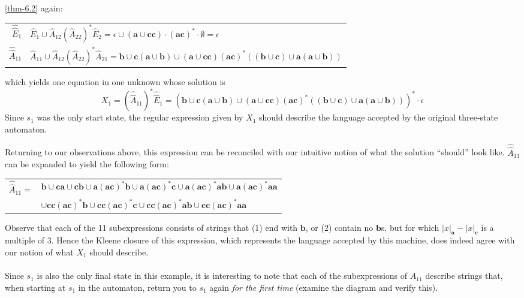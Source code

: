 \ref{thm-6.2} again:
\begin{center}\begin{tabular}{r@{ = }l}
$\hat{\hat{E}}_1$ & $\hat{E}_1 \cup \hat{A}_{12}(\hat{A}_{22})^*\hat{E}_2 = \epsilon
	\cup (\pmb{a}\cup\pmb{cc})\cdot(\pmb{ac})^*\cdot\emptyset = \epsilon$ \\
$\hat{\hat{A}}_{11}$ & $\hat{A}_{11}\cup\hat{A}_{12}(\hat{A}_{22})^*\hat{A}_{21} =
	\pmb{b}\cup\pmb{c}(\pmb{a}\cup\pmb{b})\cup(\pmb{a}\cup\pmb{cc})
	(\pmb{ac})^*((\pmb{b}\cup\pmb{c})\cup\pmb{a}(\pmb{a}\cup\pmb{b}))$
\end{tabular}\end{center}
which yields one equation in one unknown whose solution is
\[ X_1 = (\hat{\hat{A}}_{11})^*\hat{\hat{E}}_1 = (\pmb{b}\cup\pmb{c}(\pmb{a}\cup
	\pmb{b})\cup(\pmb{a}\cup\pmb{cc})(\pmb{ac})^*((\pmb{b}\cup\pmb{c})\cup
	\pmb{a}(\pmb{a}\cup\pmb{b})))^*\cdot\epsilon \]
Since $s_1$ was the only start state, the regular expression given by $X_1$
should describe the language accepted by the original three-state automaton.

Returning to our observations above, this expression can be reconciled with
our intuitive notion of what the solution ``should'' look like.
$\hat{\hat{A}}_{11}$ can be expanded to yield the following form:
\begin{center}\begin{tabular}{r@{ }l}
$\hat{\hat{A}}_{11} =$ & $\pmb{b}\cup\pmb{ca}\cup\pmb{cb}\cup\pmb{a}(\pmb{ac})^*
	\pmb{b}\cup\pmb{a}(\pmb{ac})^*\pmb{c}\cup\pmb{a}(\pmb{ac})^*\pmb{ab}\cup
	\pmb{a}(\pmb{ac})^*\pmb{aa}$ \\
& $\cup \pmb{cc}(\pmb{ac})^*\pmb{b}\cup\pmb{cc}(\pmb{ac})^*\pmb{c}\cup\pmb{cc}
	(\pmb{ac})^*\pmb{ab}\cup\pmb{cc}(\pmb{ac})^*\pmb{aa}$
\end{tabular}\end{center}
Observe that each of the 11 subexpressions consists of strings that (1) end
with $\pmb{b}$, or (2) contain no $\pmb{b}$s, but for which $|x|_{\pmb{a}} -
|x|_{\pmb{c}}$ is a multiple of 3. Hence the Kleene closure of this expression,
which represents the language accepted by this machine, does indeed agree with
our notion of what $X_1$ should describe.

Since $s_1$ is also the only final state in this example, it is interesting to
note that each of the subexpressions of $\hat{\hat{A}}_{11}$ describe strings
that, when starting at $s_1$ in the automaton, return you to $s_1$ again
\emph{for the first time} (examine the diagram and verify this).

